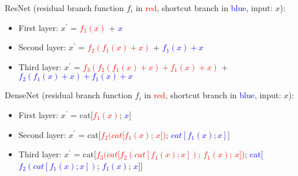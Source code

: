 \documentclass{article}
\begin{document}
ResNet (residual branch function $f_i$ in \textcolor{red}{red}, shortcut branch in \textcolor{blue}{blue}, input: {$x$}):
\begin{itemize}
    \item First layer: $x^{'}$ = \textcolor{red}{$f_1(x)$} + \textcolor{blue}{$x$}
    \item Second layer: $x^{'}$ = \textcolor{red}{$f_2(f_1(x) + x)$} + \textcolor{blue}{$f_1(x) + x$}
    \item Third layer: $x^{'}$ = \textcolor{red}{$f_3(f_2(f_1(x) + x) + f_1(x) + x)$} + \textcolor{blue}{$f_2(f_1(x) + x) + f_1(x) + x$}
\end{itemize}

DenseNet (residual branch function $f_i$ in \textcolor{red}{red}, shortcut branch in \textcolor{blue}{blue}, input: {$x$}):
\begin{itemize}
    \item First layer: $x^{'}$ = cat[\textcolor{red}{$f_1(x)$}; \textcolor{blue}{$x$}]
    \item Second layer: $x^{'}$ = cat[\textcolor{red}{$f_2(cat[f_1(x)$; $x$])}; \textcolor{blue}{$cat[f_1(x);x]$}]
    \item Third layer: $x^{'}$ = cat[\textcolor{red}{$f_3(cat[f_2(cat[f_1(x); x])$; $f_1(x)$; $x$])}; \textcolor{blue}{cat[$f_2(cat[f_1(x); x])$; $f_1(x)$; $x$]}]
\end{itemize}
\end{document}
